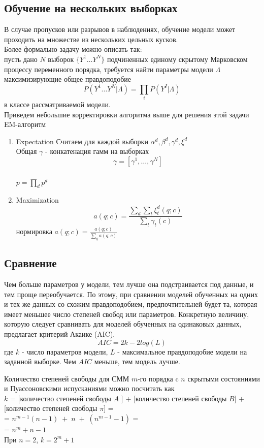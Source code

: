 \documentclass{matmex-diploma-custom}
\begin{document}
\subsection{Обучение на нескольких выборках}
В случае пропусков или разрывов в наблюдениях, обучение модели может проходить на множестве из нескольких цельных кусков.
\\
Более формально задачу можно описать так: 
\\
пусть дано $ N $ выборок $ \{Y^{1} \ldots Y^{N}\}$ подчиненных единому скрытому Марковском процессу переменного порядка, требуется найти параметры модели $\Lambda$ максимизирующие общее правдоподобие 
$$P(Y^{1} ... Y^{N}| \Lambda) = \prod_{i}{P(Y^{I}|\Lambda)}$$
в классе рассматриваемой модели.
\\
Приведем небольшие корректировки алгоритма выше для решения этой задачи
\\
EM-алгоритм
\begin{enumerate}
\item Expectation
Считаем для каждой выборки  $\alpha^{d}, \beta^{d}, \gamma^{d}, \xi^{d}$
\\
Общая $\gamma$ - конкатенация гамм на выборках
$$ \gamma = [\gamma^{1}, \ldots ,\gamma^{N}] $$
\\
$ p = \prod_{d}{p^{d}}$
\item Maximization
$$ a(q;c) = \frac{\sum_{d}{\sum_{t}{\xi^{d}_{t}(q;c)}}}{\sum_{t}{\gamma_{t}(c)}} $$
нормировка
$ a(q;c) = \frac{a(q;c)}{\sum_{q}{a(q;c)}} $
\end{enumerate}

\subsection{Сравнение}
Чем больше параметров у модели, тем лучше она подстраивается под данные, и тем проще переобучается. 
По этому, при сравнении моделей обученных на одних и тех же данных со схожим правдоподобием, предпочтительней будет та, которая имеет меньшее число степеней свобод или параметров. 
Конкретную величину, которую следует сравнивать для моделей обученных на одинаковых данных, предлагает критерий Акаике (AIC).
$$ AIC = 2k-2log(L) $$ 
где $ k $ - число параметров модели, $ L $ - максимальное правдоподобие модели на заданной выборке. Чем $AIC$ меньше, тем модель лучше. 

Количество степеней свободы для СММ $ m $-го порядка c $ n $ скрытыми состояниями и Пуассоновскими испусканиями можно посчитать как
\\
$k$ = [количество степеней свободы $ A$ ]
$+$ [количество степеней свободы $ B $] $+$ [количество степеней свободы $ \pi $] =
\\= $n^{m-1}(n-1)\;+\;n\;+\;(n^{m-1}-1)$ = 
\\= $n^m + n - 1$
\\
При $n=2$, $k=2^m + 1$ 
\end{document}
